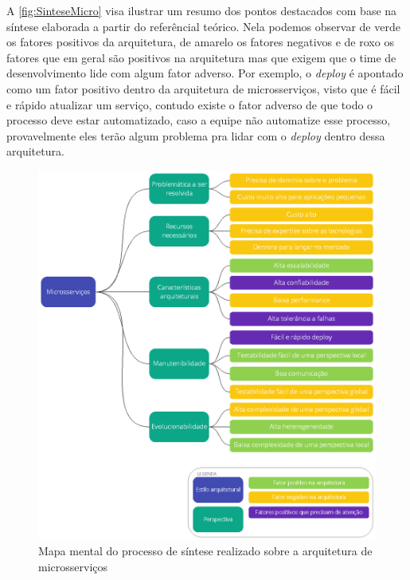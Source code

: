 \newpage

A \autoref{fig:SinteseMicro} visa ilustrar um resumo dos pontos destacados com base na síntese
elaborada a partir do referêncial teórico. Nela podemos observar de verde os fatores positivos da
arquitetura, de amarelo os fatores negativos e de roxo os fatores que em geral são positivos na
arquitetura mas que exigem que o time de desenvolvimento lide com algum fator adverso. Por exemplo,
o \textit{deploy} é apontado como um fator positivo dentro da arquitetura de microsserviços, visto
que é fácil e rápido atualizar um serviço, contudo existe o fator adverso de que todo o processo
deve estar automatizado, caso a equipe não automatize esse processo, provavelmente eles terão algum
problema pra lidar com o \textit{deploy} dentro dessa arquitetura.

\begin{figure}[h]
  \centering
  \includegraphics[keepaspectratio=true,scale=1]{figuras/sintese-microsservicos.eps}
  \caption{Mapa mental do processo de síntese realizado sobre a arquitetura de microsserviços\label{fig:SinteseMicro}}
\end{figure}


\newpage

